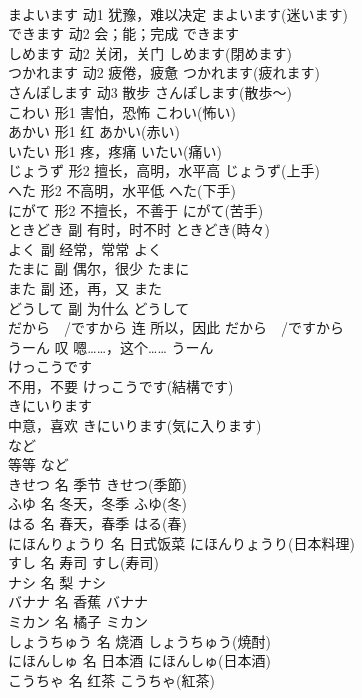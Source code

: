 \documentclass[8pt]{extreport}
\begin{document}
\begin{CJK}{UTF8}{min}
\\	まよいます	动1	犹豫，难以决定	まよいます(迷います)	
\\	できます	动2	会；能；完成	できます	
\\	しめます	动2	关闭，关门	しめます(閉めます)	
\\	つかれます	动2	疲倦，疲惫	つかれます(疲れます)	
\\	さんぽします	动3	散步	さんぽします(散歩～)	
\\	こわい	形1	害怕，恐怖	こわい(怖い)	
\\	あかい	形1	红	あかい(赤い)	
\\	いたい	形1	疼，疼痛	いたい(痛い)	
\\	じょうず	形2	擅长，高明，水平高	じょうず(上手)	
\\	へた	形2	不高明，水平低	へた(下手)	
\\	にがて	形2	不擅长，不善于	にがて(苦手)	
\\	ときどき	副	有时，时不时	ときどき(時々)	
\\	よく	副	经常，常常	よく	
\\	たまに	副	偶尔，很少	たまに	
\\	また	副	还，再，又	また	
\\	どうして	副	为什么	どうして	
\\	だから　/ですから	连	所以，因此	だから　/ですから	
\\	うーん	叹	嗯……，这个……	うーん	
\\	けっこうです	
\\	不用，不要	けっこうです(結構です)	
\\	きにいります	
\\	中意，喜欢	きにいります(気に入ります)	
\\	など	
\\	等等	など	
\\	きせつ	名	季节	きせつ(季節)	
\\	ふゆ	名	冬天，冬季	ふゆ(冬)	
\\	はる	名	春天，春季	はる(春)	
\\	にほんりょうり	名	日式饭菜	にほんりょうり(日本料理)	
\\	すし	名	寿司	すし(寿司)	
\\	ナシ	名	梨	ナシ	
\\	バナナ	名	香蕉	バナナ	
\\	ミカン	名	橘子	ミカン	
\\	しょうちゅう	名	烧酒	しょうちゅう(焼酎)	
\\	にほんしゅ	名	日本酒	にほんしゅ(日本酒)	
\\	こうちゃ	名	红茶	こうちゃ(紅茶)	

\end{CJK}
\end{document}
